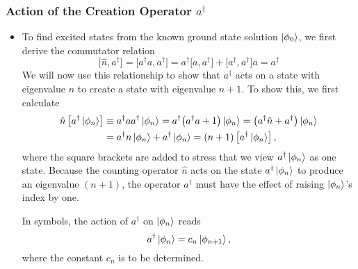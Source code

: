 \documentclass[11pt, a4paper]{article}
\renewcommand{\k}[1]{\ket{#1}}
\begin{document}
\subsubsection{Action of the Creation Operator $ a^{\dagger} $}
\begin{itemize}

	\item To find excited states from the known ground state solution $ \ket{\phi_{0}} $, we first derive the commutator relation
	\begin{equation*}
		\big[\hat{n}, a^{\dagger}\big] = \big[a^{\dagger} a, a^{\dagger}\big] = a^{\dagger}\big[a, a^{\dagger}\big] + \big[a^{\dagger}, a^{\dagger}\big]a = a^{\dagger}
	\end{equation*}
	We will now use this relationship to show that $ a^{\dagger} $ acts on a state with eigenvalue $ n $ to create a state with eigenvalue $ n + 1 $. To show this, we first calculate
	\begin{align*}
        \hat{n} \left[ a^{\dagger}\k{\phi_{n}} \right] &\equiv a^{\dagger} a a^{\dagger}\k{\phi_{n}} = a^{\dagger}\big(a^{\dagger}a + 1\big)\ket{\phi_{n}} = \big(a^{\dagger}\hat{n} + a^{\dagger}\big)\k{\phi_{n}}\\
        & = a^{\dagger}n \k{\phi_{n}} + a^{\dagger}\k{\phi_{n}} = (n + 1) \left[ a^{\dagger}\ket{\phi_{n}} \right],
	\end{align*}
    where the square brackets are added to stress that we view $ a^{\dagger}\ket{\phi_{n}} $ as one state. Because the counting operator $ \hat{n} $ acts on the state $ a^{\dagger}\ket{\phi_{n}} $ to produce an eigenvalue $ (n+1) $, the operator $ a^{\dagger} $ must have the effect of raising $ \k{\phi_{n}} $'s index by one. 

    In symbols, the action of $ a^{\dagger} $ on $ \ket{\phi_{n}} $ reads
	\begin{equation*}
		a^{\dagger} \k{\phi_{n}} = c_{n}\ket{\phi_{n + 1}},
	\end{equation*}
    where the constant $ c_{n} $ is to be determined.
	

\end{itemize}
\end{document}
